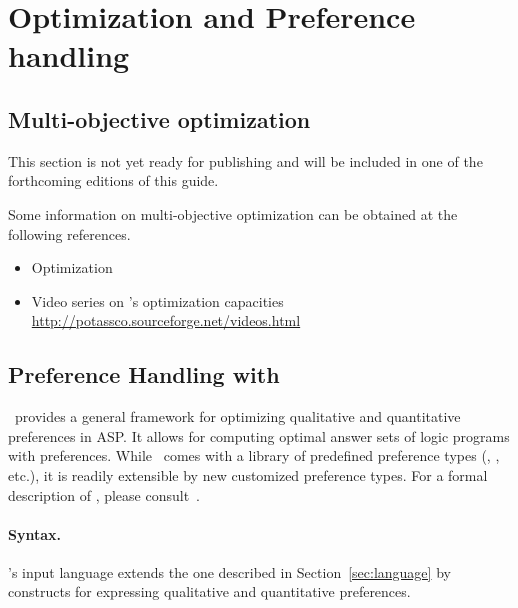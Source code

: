 
\section{Optimization and Preference handling}
\label{sec:prefopt}

\subsection{Multi-objective optimization}
\label{sec:oprimization}

This section is not yet ready for publishing
and will be included in one of the forthcoming editions of this guide.

Some information on multi-objective optimization
can be obtained at the following references.

\begin{itemize}
\item Optimization \cite{gekakasc11b,gekakasc11c,gekasc11b,ankamasc12a}
\item Video series on \clasp's optimization capacities \url{http://potassco.sourceforge.net/videos.html}
\end{itemize}

\subsection{Preference Handling with \asprin}\label{sec:asprin}
%
%
\asprin\ provides a general framework for optimizing qualitative and quantitative preferences in ASP.
It allows for computing optimal answer sets of logic programs with preferences.
While \asprin\ comes with a library of predefined preference types 
(, , etc.),
it is readily extensible by new customized preference types.
For a formal description of \asprin, please consult~\cite{brderosc15a}. 


\paragraph{Syntax.}

\asprin's input language extends the one described in Section~\ref{sec:language} by constructs for expressing qualitative and quantitative preferences.

